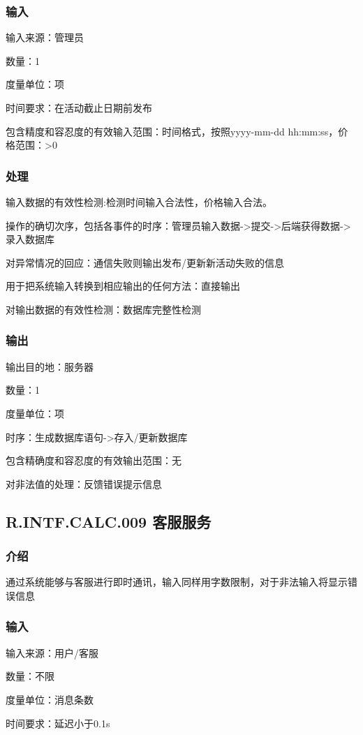 \subsubsection{输入}
		输入来源：管理员

		数量：1

		度量单位：项

		时间要求：在活动截止日期前发布

		包含精度和容忍度的有效输入范围：时间格式，按照yyyy-mm-dd hh:mm:ss，价格范围：>0
\subsubsection{处理}
	输入数据的有效性检测:检测时间输入合法性，价格输入合法。

	操作的确切次序，包括各事件的时序：管理员输入数据->提交->后端获得数据->录入数据库

	对异常情况的回应：通信失败则输出发布/更新新活动失败的信息

	用于把系统输入转换到相应输出的任何方法：直接输出

	对输出数据的有效性检测：数据库完整性检测
\subsubsection{输出}
		输出目的地：服务器

		数量：1

		度量单位：项

		时序：生成数据库语句->存入/更新数据库

		包含精确度和容忍度的有效输出范围：无

		对非法值的处理：反馈错误提示信息



\subsection{R.INTF.CALC.009 客服服务}
\subsubsection{介绍}
通过系统能够与客服进行即时通讯，输入同样用字数限制，对于非法输入将显示错误信息
\subsubsection{输入}
		输入来源：用户/客服

		数量：不限

		度量单位：消息条数

		时间要求：延迟小于0.1s

